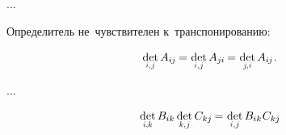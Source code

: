 \begin{otherlanguage}{russian}
...

Определитель не~чувствителен к~транспонированию:

\nopagebreak\vspace{-0.25em}\begin{equation*}
\underset{\raisebox{.15em}{\scalebox{0.7}{$i$,$\hspace{.15ex}j$}}}{\operatorname{det}} \, A_{i\hspace{-0.1ex}j} \hspace{-0.16ex}
= \hspace{.1ex} \underset{\raisebox{.15em}{\scalebox{0.7}{$i$,$\hspace{.15ex}j$}}}{\operatorname{det}} \, A_{j\hspace{-0.06ex}i} \hspace{-0.16ex}
= \hspace{.1ex} \underset{\raisebox{.15em}{\scalebox{0.7}{$j\hspace{-0.2ex}$,$\hspace{.1ex}i$}}}{\operatorname{det}} \, A_{i\hspace{-0.1ex}j}
\hspace{.1ex} .
\end{equation*}

...


\nopagebreak\vspace{-0.2em}\begin{equation}\label{determinantofmatrixproduct}
\underset{\raisebox{.15em}{\scalebox{0.7}{$i$,$k$}}}{\operatorname{det}} \, B_{ik} \hspace{.4ex} \underset{\raisebox{.15em}{\scalebox{0.7}{$k$,$\hspace{.15ex}j$}}}{\operatorname{det}} \, C_{kj} \hspace{-0.15ex}
= \hspace{.1ex} \underset{\raisebox{.15em}{\scalebox{0.7}{$i$,$\hspace{.15ex}j$}}}{\operatorname{det}} \, B_{ik} \hspace{.1ex} C_{kj}
\end{equation}


\end{otherlanguage}
